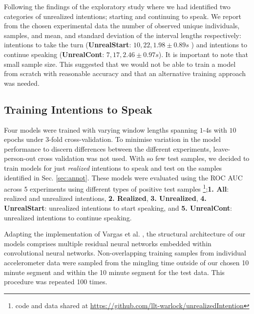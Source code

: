 \documentclass[manuscript,screen,review]{acmart}
\begin{document}
Following the findings of the exploratory study where we had identified two categories of unrealized intentions; starting and continuing to speak. We report from the chosen experimental data the number of observed unique individuals, samples, and mean, and standard deviation of the interval lengths respectively: intentions to take the turn (\textbf{UnrealStart}: $10,22,1.98\pm0.89s$ ) and intentions to continue speaking (\textbf{UnrealCont}: $7,17,2.46\pm0.97s$). 
It is important to note that small sample size. This suggested that we would not be able to train a model from scratch with reasonable accuracy and that an alternative training approach was needed.


\subsection{Training Intentions to Speak}
\label{sec:training}
Four models were trained with varying window lengths spanning $1$-$4$s with $10$ epochs under $3$-fold cross-validation. To minimise variation in the model performance to discern differences between the different experiments, leave-person-out cross validation was not used. With so few test samples, we decided to train models for just \emph{realized} intentions to speak and test on the samples identified in Sec. \ref{sec:annot}. These models were evaluated using the ROC AUC across 5 experiments using different types of positive test samples \footnote{code and data shared at \url{https://github.com/llt-warlock/unrealizedIntention}};\textbf{1. All}: realized and unrealized intentions, 
\textbf{2. Realized}, 
\textbf{3. Unrealized}, 
 \textbf{4. UnrealStart}: unrealized intentions to start speaking, and \textbf{5. UnrealCont}: unrealized intentions to continue speaking.

 Adapting the implementation of Vargas et al. \cite{laughterquiros2023}, the structural architecture of our models comprises multiple residual neural networks embedded within convolutional neural networks. Non-overlapping training samples from individual accelerometer data were sampled from the mingling time outside of our chosen 10 minute segment and within the 10 minute segment for the test data.  This procedure was repeated 100 times. 
\end{document}
